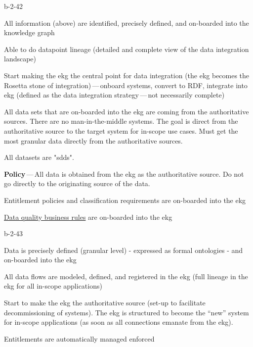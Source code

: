 \begin{level-assessment}{b-2-4}{2}

    \item All information (above) are identified, precisely defined, and on-boarded into the knowledge graph
    \item Able to do datapoint lineage (detailed and complete view of the data integration landscape)
    \item Start making the \gls{ekg} the central point for data integration (the \gls{ekg} becomes the Rosetta stone of
          integration)\,---\,onboard systems, convert to RDF, integrate into \gls{ekg} (defined as the
          data integration strategy\,---\,not necessarily complete)
    \item All data sets that are on-boarded into the \gls{ekg} are coming from the authoritative sources.
          There are no man-in-the-middle systems.
          The goal is direct from the authoritative source to the target system for in-scope use cases.
          Must get the most granular data directly from the authoritative sources.
    \item All datasets are "\glspl{sdd}".
    \item \textbf{Policy}\,---\,All data is obtained from the \gls{ekg} as the authoritative source.
          Do not go directly to the originating source of the data.
    \item Entitlement policies and classification requirements are on-boarded into the \gls{ekg}
    \item \hyperref[sec:ekg-mm-data-quality-business-rules]{Data quality business rules}
          are on-boarded into the \gls{ekg}

\end{level-assessment}

\begin{level-assessment}{b-2-4}{3}

    \item Data is precisely defined (granular level) - expressed as formal ontologies - and on-boarded into the \gls{ekg}
    \item All data flows are modeled, defined, and registered in the \gls{ekg} (full lineage in the \gls{ekg} for all
          in-scope applications)
    \item Start to make the \gls{ekg} the authoritative source (set-up to facilitate decommissioning of systems).
          The \gls{ekg} is structured to become the “new” system for in-scope applications (as soon as all
          connections emanate from the \gls{ekg}).
    \item Entitlements are automatically managed enforced

\end{level-assessment}

